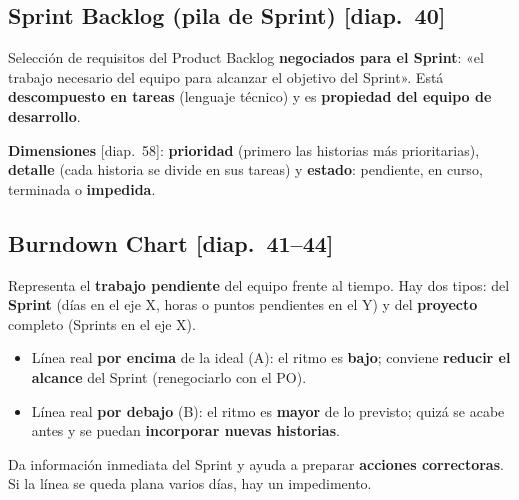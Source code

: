 \documentclass[11pt,a4paper,oneside,openany]{report}
\newcommand{\diap}[1]{\textcolor{mdaPrimary}{\small[diap.~#1]}}
\begin{document}
\subsection{Sprint Backlog (pila de Sprint) \diap{40}}
\begin{definicion}
Selección de requisitos del Product Backlog \textbf{negociados para el Sprint}: «el trabajo necesario del equipo para
alcanzar el objetivo del Sprint». Está \textbf{descompuesto en tareas} (lenguaje técnico) y es \textbf{propiedad del
equipo de desarrollo}.
\end{definicion}
\textbf{Dimensiones} \diap{58}: \textbf{prioridad} (primero las historias más prioritarias), \textbf{detalle} (cada
historia se divide en sus tareas) y \textbf{estado}: pendiente, en curso, terminada o \textbf{impedida}.

\subsection{Burndown Chart \diap{41--44}}
Representa el \textbf{trabajo pendiente} del equipo frente al tiempo. Hay dos tipos: del \textbf{Sprint} (días en el
eje X, horas o puntos pendientes en el Y) y del \textbf{proyecto} completo (Sprints en el eje X).
\begin{center}
\end{center}
\begin{aviso}[cómo se interpreta \diap{44}]
\begin{itemize}[leftmargin=*]
  \item Línea real \textbf{por encima} de la ideal (A): el ritmo es \textbf{bajo}; conviene \textbf{reducir el alcance}
        del Sprint (renegociarlo con el PO).
  \item Línea real \textbf{por debajo} (B): el ritmo es \textbf{mayor} de lo previsto; quizá se acabe antes y se
        puedan \textbf{incorporar nuevas historias}.
\end{itemize}
Da información inmediata del Sprint y ayuda a preparar \textbf{acciones correctoras}. Si la línea se queda plana
varios días, hay un impedimento.
\end{aviso}
\end{document}
